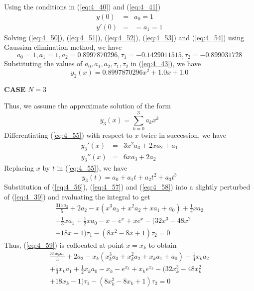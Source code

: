 \documentclass[12pt]{report}
\newcommand{\sps}{\\[0.2cm]}
\newcommand{\refn}[1]{(\ref{#1})}
\newcommand{\refx}[1]{\refn{eq:#1}}
\newcommand{\bt}[1]{\textbf{#1}}
\newcommand{\sprime}{'}
\newcommand{\dprime}{''}
\newcommand{\dsp}{\displaystyle}
\begin{document}
	Using the conditions in \refx{4_40} and \refx{4_41}
	\begin{eqnarray}
		y(0) &=& a_0 = 1 \label{eq:4_53}\\
		y\sprime(0) &=& = a_1 =  1 \label{eq:4_54}
	\end{eqnarray}
	Solving \refx{4_50}, \refx{4_51}, \refx{4_52}, \refx{4_53} and \refx{4_54} using Gaussian elimination method, we have
	\begin{equation*}
		a_0 = 1, a_1=1, a_2 = 0.8997870296, \tau_1 = -0.1429011515, \tau_2 = -0.899031728
	\end{equation*}
	Substituting the values of $a_0, a_1, a_2, \tau_1, \tau_2$ in \refx{4_43}, we have
	\begin{equation*}
		y_2(x) = 0.8997870296x^2 + 1.0x + 1.0
	\end{equation*}
	\begin{center}
		\large \bt{CASE} $N=3$
	\end{center}
	Thus, we assume the approximate solution of the form
	\begin{equation}
		y_3(x) = \sum_{k=0}^{3}a_kx^k \label{eq:4_55}
	\end{equation}
	Differentiating \refx{4_55} with respect to $x$ twice in succession, we have
	\begin{eqnarray}
		y_3\sprime(x) &=& 3x^2a_3 + 2xa_2 + a_1 \label{eq:4_56}\\
		y_3\dprime(x) &=& 6xa_3 + 2a_2\label{eq:4_57}
	\end{eqnarray}
	Replacing $x$ by $t$ in \refx{4_55}, we have
	\begin{equation}
		y_3(t) = a_0 + a_1t + a_2t^2 + a_3t^3 \label{eq:4_58}
	\end{equation}
	Substitution of \refx{4_56}, \refx{4_57} and \refx{4_58} into a slightly perturbed of \refx{4_39} and evaluating the integral to get
	\begin{equation}
		\begin{array}{c}
			\dsp \frac{31xa_3}{5}+ 2a_2 - x(x^3a_3 + x^2a_2 + xa_1 + a_0)+\frac{1}{4}xa_2\sps
			 \dsp + \frac{1}{3}xa_1 + \frac{1}{2}xa_0 - x - e^x + xe^x - (32x^3 - 48x^2\sps
			 + 18x - 1)\tau_1 - (8x^2 - 8x+1)\tau_2 = 0
		\end{array}
		\label{eq:4_59}
	\end{equation}
	Thus, \refx{4_59} is collocated at point $x=x_k$ to obtain
	\begin{equation}
		\begin{array}{c}
			\dsp \frac{31x_ka_3}{5}+ 2a_2 - x_k(x_k^3a_3 + x_k^2a_2 + x_ka_1 + a_0)+\frac{1}{4}x_ka_2\sps
			\dsp + \frac{1}{3}x_ka_1 + \frac{1}{2}x_ka_0 - x_k - e^{x_k} + x_ke^{x_k} - (32x_k^3 - 48x_k^2\sps
			+ 18x_k - 1)\tau_1 - (8x_k^2 - 8x_k+1)\tau_2 = 0
		\end{array}
		\label{eq:4_60}
	\end{equation}
\end{document}

